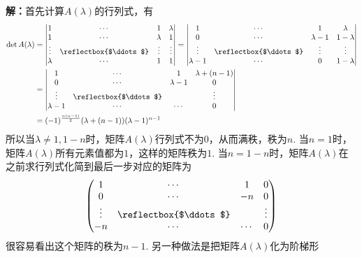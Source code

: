 {\bf 解：}首先计算$A(\lambda)$的行列式，有
\begin{align*}
    \det A(\lambda) & = \begin{vmatrix} 1 & \cdots & 1 & \lambda \\ 1 & \cdots & \lambda & 1 \\ \vdots & \reflectbox{$\ddots$} & \vdots & \vdots \\ \lambda & \cdots & 1 & 1 \end{vmatrix} = \begin{vmatrix} 1 & \cdots & 1 & \lambda \\ 0 & \cdots & \lambda-1 & 1-\lambda \\ \vdots & \reflectbox{$\ddots$} & \vdots & \vdots \\ \lambda-1 & \cdots & 0 & 1-\lambda \end{vmatrix} \\
    & = \begin{vmatrix} 1 & \cdots & 1 & \lambda + (n-1) \\ 0 & \cdots & \lambda-1 & 0 \\ \vdots & \reflectbox{$\ddots$} & & \vdots \\ \lambda-1 & \cdots & \cdots & 0 \end{vmatrix} \\
    & = (-1)^{\frac{n(n-1)}{2}} (\lambda+(n-1))(\lambda-1)^{n-1}
\end{align*}
所以当$\lambda \neq 1, 1-n$时，矩阵$A(\lambda)$行列式不为$0$，从而满秩，秩为$n$. 当$n = 1$时，矩阵$A(\lambda)$所有元素值都为$1$，这样的矩阵秩为$1$. 当$n = 1-n$时，矩阵$A(\lambda)$在之前求行列式化简到最后一步对应的矩阵为
$$\begin{pmatrix} 1 & \cdots & 1 & 0 \\ 0 & \cdots & -n & 0 \\ \vdots & \reflectbox{$\ddots$} & & \vdots \\ -n & \cdots & \cdots & 0 \end{pmatrix}$$
很容易看出这个矩阵的秩为$n-1$. 另一种做法是把矩阵$A(\lambda)$化为阶梯形
